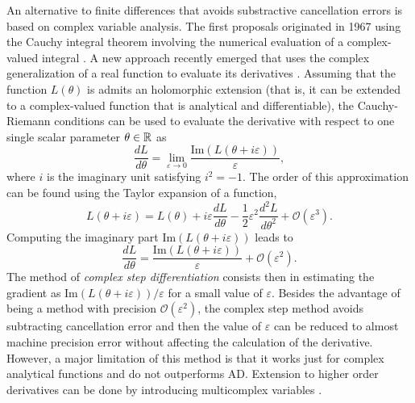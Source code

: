 An alternative to finite differences that avoids substractive cancellation errors is based on complex variable analysis. 
The first proposals originated in 1967 using the Cauchy integral theorem involving the numerical evaluation of a complex-valued integral \cite{Lyness_1967, Lyness_Moler_1967}.
A new approach recently emerged that uses the complex generalization of a real function to evaluate its derivatives \cite{Squire_Trapp_1998_complex_diff, Martins_Sturdza_Alonso_2003_complex_differentiation}. 
Assuming that the function $L(\theta)$ is admits an holomorphic extension (that is, it can be extended to a complex-valued function that is analytical and differentiable\cite{stein2010complex}), the Cauchy-Riemann conditions can be used to evaluate the derivative with respect to one single scalar parameter $\theta \in \operatorname{\mathbb{R}}$ as
\begin{equation}
    \frac{dL}{d\theta} = \lim_{\varepsilon \rightarrow 0} \frac{\text{Im}(L(\theta + i \varepsilon))}{\varepsilon},
\end{equation}
where $i$ is the imaginary unit satisfying $i^2 = -1$. 
The order of this approximation can be found using the Taylor expansion of a function,
\begin{equation}
    L(\theta + i \varepsilon)
    = 
    L(\theta) + i \varepsilon \frac{dL}{d\theta} 
    - 
    \frac 1 2  \varepsilon^2
    \frac{d^2 L}{d\theta^2}
    + 
    \mathcal O (\varepsilon^3).
\end{equation}
Computing the imaginary part $\text{Im}(L(\theta + i \varepsilon))$ leads to
\begin{equation}
    \frac{dL}{d\theta} 
    = 
    \frac{\text{Im}(L(\theta + i \varepsilon))}{\varepsilon}
    + 
    \mathcal{O} (\varepsilon^2).
    \label{eq:complex-step-definition}
\end{equation}
The method of \textit{complex step differentiation} consists then in estimating the gradient as $\text{Im}(L(\theta + i \varepsilon)) / \varepsilon$ for a small value of $\varepsilon$. 
Besides the advantage of being a method with precision $\mathcal{O}(\varepsilon^2)$, the complex step method avoids subtracting cancellation error and then the value of $\varepsilon$ can be reduced to almost machine precision error without affecting the calculation of the derivative. 
However, a major limitation of this method is that it works just for complex analytical functions \cite{Martins_Sturdza_Alonso_2003_complex_differentiation} and do not outperforms AD.
Extension to higher order derivatives can be done by introducing multicomplex variables \cite{Lantoine_Russell_Dargent_2012}. 

